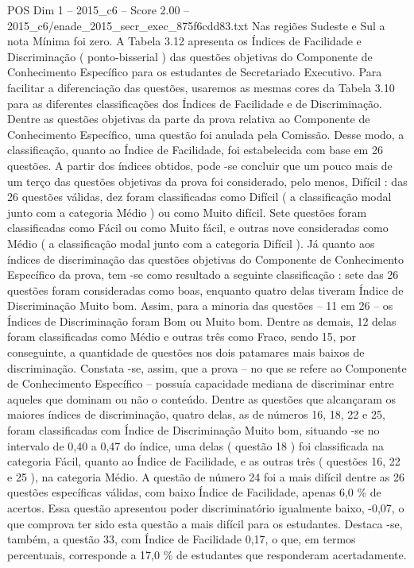 \begin{textsample}{POS Dim 1 – 2015\_c6 – Score 2.00 – 2015\_c6/enade\_2015\_secr\_exec\_875f6cdd83.txt}
Nas regiões Sudeste e Sul a nota Mínima foi zero.
A Tabela 3.12 apresenta os Índices de Facilidade e Discriminação ( ponto-bisserial ) das questões objetivas do Componente de Conhecimento Específico para os estudantes de Secretariado Executivo.
Para facilitar a diferenciação das questões, usaremos as mesmas cores da Tabela 3.10 para as diferentes classificações dos Índices de Facilidade e de Discriminação.
Dentre as questões objetivas da parte da prova relativa ao Componente de Conhecimento Específico, uma questão foi anulada pela Comissão.
Desse modo, a classificação, quanto ao Índice de Facilidade, foi estabelecida com base em 26 questões.
A partir dos índices obtidos, pode -se concluir que um pouco mais de um terço das questões objetivas da prova foi considerado, pelo menos, Difícil : das 26 questões válidas, dez foram classificadas como Difícil ( a classificação modal junto com a categoria Médio ) ou como Muito difícil.
Sete questões foram classificadas como Fácil ou como Muito fácil, e outras nove consideradas como Médio ( a classificação modal junto com a categoria Difícil ).
Já quanto aos índices de discriminação das questões objetivas do Componente de Conhecimento Específico da prova, tem -se como resultado a seguinte classificação : sete das 26 questões foram consideradas como boas, enquanto quatro delas tiveram Índice de Discriminação Muito bom.
Assim, para a minoria das questões – 11 em 26 – os Índices de Discriminação foram Bom ou Muito bom.
Dentre as demais, 12 delas foram classificadas como Médio e outras três como Fraco, sendo 15, por conseguinte, a quantidade de questões nos dois patamares mais baixos de discriminação.
Constata -se, assim, que a prova – no que se refere ao Componente de Conhecimento Específico – possuía capacidade mediana de discriminar entre aqueles que dominam ou não o conteúdo.
Dentre as questões que alcançaram os maiores índices de discriminação, quatro delas, as de números 16, 18, 22 e 25, foram classificadas com Índice de Discriminação Muito bom, situando -se no intervalo de 0,40 a 0,47 do índice, uma delas ( questão 18 ) foi classificada na categoria Fácil, quanto ao Índice de Facilidade, e as outras três ( questões 16, 22 e 25 ), na categoria Médio.
A questão de número 24 foi a mais difícil dentre as 26 questões específicas válidas, com baixo Índice de Facilidade, apenas 6,0 \% de acertos.
Essa questão apresentou poder discriminatório igualmente baixo, -0,07, o que comprova ter sido esta questão a mais difícil para os estudantes.
Destaca -se, também, a questão 33, com Índice de Facilidade 0,17, o que, em termos percentuais, corresponde a 17,0 \% de estudantes que responderam acertadamente.

\end{textsample}
